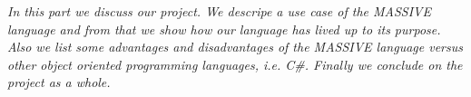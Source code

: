 \textit{In this part we discuss our project. We descripe a use case of the MASSIVE language and from that we show how our language has lived up to its purpose. Also we list some advantages and disadvantages of the MASSIVE language versus other object oriented programming languages, i.e. C\#. Finally we conclude on the project as a whole.}\\ \\
